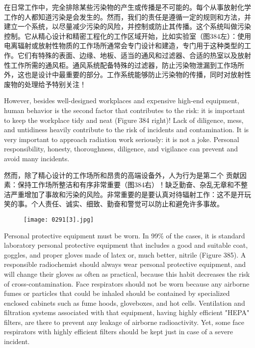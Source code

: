 \documentclass[dvipsnames, svgnames,a4paper,11pt]{article}
\begin{document}
在日常工作中，完全排除某些污染物的产生或传播是不可能的。每个从事放射化学工作的人都知道污染是会发生的。然而，我们的责任是遵循一定的规则和方法，并建立一个系统，以尽量减少污染的风险，并控制或防止其传播。这个系统叫做污染控制。它从精心设计和精密工程化的工作区域开始，比如实验室（图384左）：使用电离辐射或放射性物质的工作场所通常会专门设计和建造，专门用于这种类型的工作。它们有特殊的表面、边缘、地板、适当的通风和过滤器、合适的热室以及放射性工作所需的通风柜。通风系统配备特殊的过滤器，防止污染物泄漏到工作场所外，这也是设计中最重要的部分。工作系统能够防止污染物的传播，同时对放射性废物的处理给予特别关注！

However, besides well-designed workplaces and expensive high-end equipment, human behavior is the second factor that contributes to the risk: it is important to keep the workplace tidy and neat (Figure 384 right)! Lack of diligence, mess, and untidiness heavily contribute to the risk of incidents and contamination. It is very important to approach radiation work seriously: it is not a joke. Personal responsibility, honesty, thoroughness, diligence, and vigilance can prevent and avoid many incidents.


然而，除了精心设计的工作场所和昂贵的高端设备外，人为行为是第二个 贡献因素：保持工作场所整洁和有序非常重要（图384右）！缺乏勤奋、杂乱无章和不整洁严重增加了事故和污染的风险。非常重要的是要认真对待辐射工作：这不是开玩笑的事。个人责任、诚实、细致、勤奋和警觉可以防止和避免许多事故。

\begin{figure}[h]
    \centering
    \texttt{[image: 0291[3].jpg]}
     \label{fig385}
\end{figure}

Personal protective equipment must be worn. In 99\% of the cases, it is standard laboratory personal protective equipment that includes a good and suitable coat, goggles, and proper gloves made of latex or, much better, nitrile (Figure 385). A responsible radiochemist should always wear personal protective equipment, and will change their gloves as often as practical, because this habit decreases the risk of cross-contamination. Face respirators should not be worn because any airborne fumes or particles that could be inhaled should be contained by specialized enclosed cabinets such as fume hoods, gloveboxes, and hot cells. Ventilation and filtration systems associated with that equipment, having highly efficient "HEPA" filters, are there to prevent any leakage of airborne radioactivity. Yet, some face respirators with highly efficient filters should be kept just in case of a severe incident.
\end{document}
